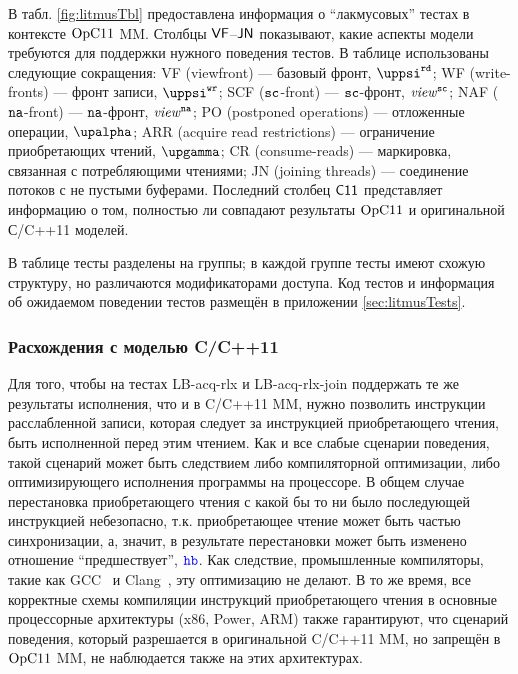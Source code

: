 В табл. \ref{fig:litmusTbl} предоставлена информация о ``лакмусовых'' тестах в контексте $\mathrm{OpC11}$ MM.
Столбцы ${\sf VF}$--${\sf JN}$ показывают, какие аспекты модели требуются для поддержки нужного поведения тестов.
В таблице использованы следующие сокращения:
  \textsf{VF} (viewfront) --- базовый фронт, $\stPsiRead$;
  \textsf{WF} (write-fronts) --- фронт записи, $\stPsiWrite$;
  \textsf{SCF} (${\mathtt{sc}}$-front) --- ${\mathtt{sc}}$-фронт, $\mathit{view}^{\text{\scriptsize{\texttt{sc}}}}$;
  \textsf{NAF} ($\mathtt{na}$-front) --- $\mathtt{na}$-фронт, $\mathit{view}^{\text{\scriptsize{\texttt{na}}}}$;
  \textsf{PO} (postponed operations) --- отложенные операции, $\stAlpha$;
  \textsf{ARR} (acquire read restrictions) --- ограничение приобретающих чтений, $\stGamma$;
  \textsf{CR} (consume-reads) --- маркировка, связанная с потребляющими чтениями;
  \textsf{JN} (joining threads) --- соединение потоков с не пустыми буферами.
Последний столбец ${\sf C11}$ представляет информацию о том, полностью ли совпадают результаты $\mathrm{OpC11}$ и оригинальной С/C++11 моделей.

В таблице тесты разделены на группы;
в каждой группе тесты имеют схожую структуру, но различаются модификаторами доступа.
Код тестов и информация об ожидаемом поведении тестов размещён в приложении \ref{sec:litmusTests}.

\subsubsection{Расхождения с моделью C/C++11}
Для того, чтобы на тестах \textrm{LB-acq-rlx} и \textrm{LB-acq-rlx-join} поддержать те же результаты исполнения,
что и в C/C++11 MM, нужно позволить инструкции расслабленной записи, которая следует за
инструкцией приобретающего чтения, быть исполненной перед этим чтением.
Как и все слабые сценарии поведения, такой сценарий может быть следствием либо компиляторной оптимизации,
либо оптимизирующего исполнения программы на процессоре.
В общем случае перестановка приобретающего чтения с какой бы то ни было последующей инструкцией небезопасно,
т.к. приобретающее чтение может быть частью синхронизации, а, значит, в результате перестановки может быть
изменено отношение ``предшествует'', $\lHB$. Как следствие, промышленные компиляторы, такие как
GCC~\cite{GCC} и Clang~\cite{CLANG}, эту оптимизацию не делают.
В то же время, все корректные схемы компиляции инструкций приобретающего чтения в основные процессорные архитектуры (x86, Power, ARM)
также гарантируют, что сценарий поведения, который разрешается в оригинальной C/C++11 MM, но запрещён в $\mathrm{OpC11}$ MM,
не наблюдается также на этих архитектурах.

